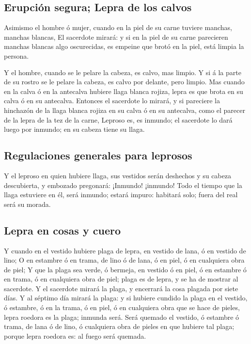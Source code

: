 \hypertarget{erupciuxf3n-segura-lepra-de-los-calvos}{%
\subsection{Erupción segura; Lepra de los
calvos}\label{erupciuxf3n-segura-lepra-de-los-calvos}}

 Asimismo el hombre ó mujer, cuando en la piel de su
carne tuviere manchas, manchas blancas,  El sacerdote
mirará: y si en la piel de su carne parecieren manchas blancas algo
oscurecidas, es empeine que brotó en la piel, está limpia la persona.

 Y el hombre, cuando se le pelare la cabeza, es calvo,
mas limpio.  Y si á la parte de su rostro se le pelare la
cabeza, es calvo por delante, pero limpio.  Mas cuando en
la calva ó en la antecalva hubiere llaga blanca rojiza, lepra es que
brota en su calva ó en su antecalva.  Entonces el
sacerdote lo mirará, y si pareciere la hinchazón de la llaga blanca
rojiza en su calva ó en su antecalva, como el parecer de la lepra de la
tez de la carne,  Leproso es, es inmundo; el sacerdote lo
dará luego por inmundo; en su cabeza tiene su llaga.

\hypertarget{regulaciones-generales-para-leprosos}{%
\subsection{Regulaciones generales para
leprosos}\label{regulaciones-generales-para-leprosos}}

 Y el leproso en quien hubiere llaga, sus vestidos serán
deshechos y su cabeza descubierta, y embozado pregonará: ¡Inmundo!
¡inmundo!  Todo el tiempo que la llaga estuviere en él,
será inmundo; estará impuro: habitará solo; fuera del real será su
morada.

\hypertarget{lepra-en-cosas-y-cuero}{%
\subsection{Lepra en cosas y cuero}\label{lepra-en-cosas-y-cuero}}

 Y cuando en el vestido hubiere plaga de lepra, en
vestido de lana, ó en vestido de lino;  O en estambre ó
en trama, de lino ó de lana, ó en piel, ó en cualquiera obra de piel;
 Y que la plaga sea verde, ó bermeja, en vestido ó en
piel, ó en estambre ó en trama, ó en cualquiera obra de piel; plaga es
de lepra, y se ha de mostrar al sacerdote.  Y el
sacerdote mirará la plaga, y encerrará la cosa plagada por siete días.
 Y al séptimo día mirará la plaga: y si hubiere cundido
la plaga en el vestido, ó estambre, ó en la trama, ó en piel, ó en
cualquiera obra que se hace de pieles, lepra roedora es la plaga;
inmunda será.  Será quemado el vestido, ó estambre ó
trama, de lana ó de lino, ó cualquiera obra de pieles en que hubiere tal
plaga; porque lepra roedora es: al fuego será quemada.

